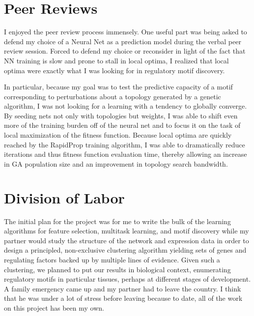 \documentclass[12pt,a4paper]{article}
\begin{document}
\begin{multicols}{2}
\section{Peer Reviews} 

I enjoyed the peer review process immensely. One useful part was being asked to defend my choice of a Neural Net as a prediction model during the verbal peer review session. Forced to defend my choice or reconsider in light of the fact that NN training is slow and prone to stall in local optima, I realized that local optima were exactly what I was looking for in regulatory motif discovery. 

In particular, because my goal was to test the predictive capacity of a motif corresponding to perturbations about a topology generated by a genetic algorithm, I was not looking for a learning with a tendency to globally converge. By seeding nets not only with topologies but weights, I was able to shift even more of the training burden off of the neural net and to focus it on the task of local maximization of the fitness function. Because local optima are quickly reached by the RapidProp training algorithm, I was able to dramatically reduce iterations and thus fitness function evaluation time, thereby allowing an increase in GA population size and an improvement in topology search bandwidth.

\section{Division of Labor}

The initial plan for the project was for me to write the bulk of the learning algorithms for feature selection, multitask learning, and motif discovery while my partner would study the structure of the network and expression data in order to design a principled, non-exclusive clustering algorithm yielding sets of genes and regulating factors backed up by multiple lines of evidence. Given such a clustering, we planned to put our results in biological context, enumerating regulatory motifs in particular tissues, perhaps at different stages of development. A family emergency came up and my partner had to leave the country. I think that he was under a lot of stress before leaving because to date, all of the work on this project has been my own.










\end{multicols}  
\end{document}
